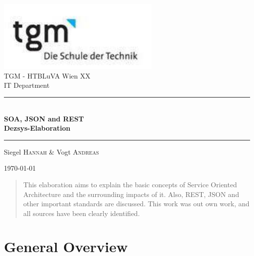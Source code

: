 \documentclass[12pt]{article}
\begin{document}
\begin{titlepage}
\begin{center}
\includegraphics[width=0.6\textwidth]{images/logo}\\[1cm]    



\LARGE TGM - HTBLuVA Wien XX \\ IT Department  \\[1.5cm]

\rule{1.0\textwidth}{1mm}
{ \huge \bfseries \\[0.4cm]  \huge SOA, JSON and REST \\ \LARGE Dezsys-Elaboration \\[0.4cm] }

\rule{1.0\textwidth}{1mm}


\noindent 
\vspace{0.5cm}


\small
\begin{center}
\large
Siegel \textsc{Hannah} \&
Vogt \textsc{Andreas}
\end{center}

{\large \today}
\normalsize
\vfill
\begin{abstract}This elaboration aims to explain the basic concepts of Service Oriented Architecture and the surrounding impacts of it. Also, REST, JSON and other important standards are discussed. This work was out own work, and all sources have been clearly identified.
\end{abstract}

\end{center}
\end{titlepage}

{\small\tableofcontents}


\ohead{\headmark}

\newpage

\section{General Overview}
\end{document}
